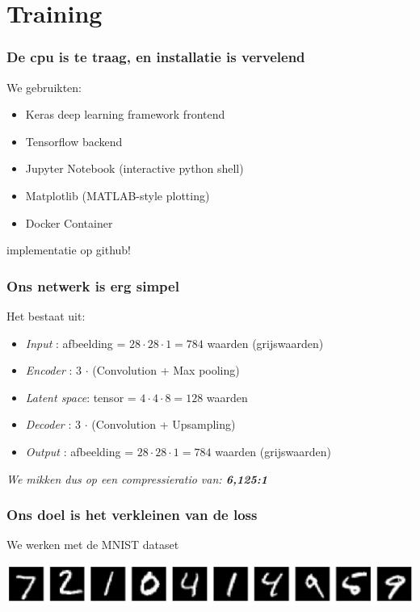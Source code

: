 \documentclass[]{beamer}
\begin{document}
\section{Training}

\begin{frame}
	\frametitle{De cpu is te traag, en installatie is vervelend}
	We gebruikten:\pause
	\begin{itemize}
		\item Keras deep learning framework frontend \pause
		\item Tensorflow backend \pause
		\item Jupyter Notebook (interactive python shell) \pause
		\item Matplotlib (MATLAB-style plotting) \pause
		\item Docker Container \pause
	\end{itemize}
	implementatie op github!
\end{frame}

\begin{frame}
	\frametitle{Ons netwerk is erg simpel}
	Het bestaat uit:\pause
	\begin{itemize}
		\item \emph{Input}       : afbeelding = $ 28 \cdot 28 \cdot 1 = 784$ waarden (grijswaarden) \pause
		\item \emph{Encoder}     : 3 $\cdot$ (Convolution + Max pooling) \pause
		\item \emph{Latent space}: tensor = $4 \cdot 4 \cdot 8 = 128$ waarden \pause
		\item \emph{Decoder}     : 3 $\cdot$ (Convolution + Upsampling) \pause
		\item \emph{Output}      : afbeelding = $ 28 \cdot 28 \cdot 1 = 784$ waarden (grijswaarden) \pause
	\end{itemize}
	\emph{We mikken dus op een compressieratio van: \textbf{6,125:1}}
\end{frame}

\begin{frame}
	\frametitle{Ons doel is het verkleinen van de loss}
	We werken met de MNIST dataset
	\vspace{10 mm}

	\centering
	\includegraphics[width = \textwidth]{mnist.png}
\end{frame}
\end{document}

